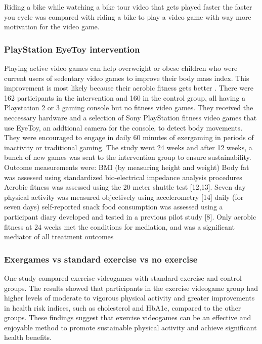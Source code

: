 Riding a bike while watching a bike tour video that gets played faster the faster you cycle was compared with riding a bike to play a video game with way more motivation for the video game. \cite{hardy2011adoption}

\subsubsection{PlayStation EyeToy intervention}
Playing active video games can help overweight or obese children who were current users of sedentary video games to improve their body mass index. This improvement is most likely because their aerobic fitness gets better \cite{maddison12avg}. There were 162 participants in the intervention and 160 in the control group, all having a Playstation 2 or 3 gaming console but no fitness video games. They received the neccessary hardware and a selection of Sony PlayStation fitness video games that use EyeToy, an addtional camera for the console, to detect body movements. They were encouraged to engage in daily 60 minutes of exergaming in periods of inactivity or traditional gaming. The study went 24 weeks and after 12 weeks, a bunch of new games was sent to the intervention group to ensure sustainability.
Outcome measurements were:
BMI (by measuring height and weight)
Body fat was assessed using standardized bio-electrical impedance analysis procedures
Aerobic fitness was assessed using the 20 meter shuttle test [12,13].
Seven day physical activity was measured objectively using accelerometry [14]
daily (for seven days) self-reported snack food consumption was assessed using a participant diary developed and tested in a previous pilot study [8].
Only aerobic fitness at 24 weeks met the conditions for mediation, and was a significant mediator of all treatment outcomes

\subsubsection{Exergames vs standard exercise vs no exercise}
One study \cite{bock2019exercise} compared exercise videogames with standard exercise and control groups. The results showed that participants in the exercise videogame group had higher levels of moderate to vigorous physical activity and greater improvements in health risk indices, such as cholesterol and HbA1c, compared to the other groups. These findings suggest that exercise videogames can be an effective and enjoyable method to promote sustainable physical activity and achieve significant health benefits.


